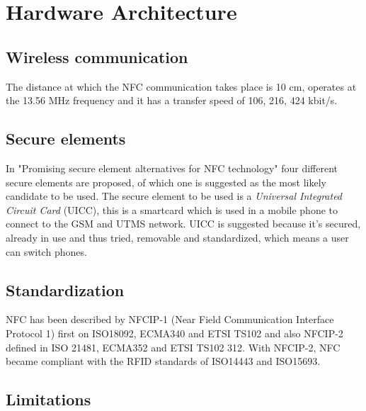 \chapter{Hardware Architecture}
\label{chap:hardware_architecture}


\section{Wireless communication}
The distance at which the NFC communication takes place is 10 cm, operates at the 13.56 MHz frequency and it has a transfer speed of 106, 216, 424 kbit/s.


\section{Secure elements}
In "Promising secure element alternatives for NFC technology" four different secure elements are proposed, of which one is suggested as the most likely candidate to be used.
The secure element to be used is a \textit{Universal Integrated Circuit Card} (UICC), this is a smartcard which is used in a mobile phone to connect to the GSM and UTMS network. %
UICC is suggested because it's secured, already in use and thus tried, removable and standardized, which means a user can switch phones. 

\section{Standardization}
NFC has been described by NFCIP-1 (Near Field Communication Interface Protocol 1) first on ISO18092, ECMA340 and ETSI TS102 and also NFCIP-2 defined in ISO 21481, ECMA352 and ETSI TS102 312.
With NFCIP-2, NFC became compliant with the RFID standards of ISO14443 and ISO15693.

\section{Limitations}

